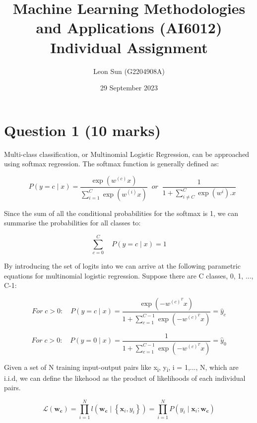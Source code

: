 \documentclass{article}
\title{ Machine Learning Methodologies and Applications (AI6012) Individual Assignment}
\author{Leon Sun (G2204908A)}
\date{29 September 2023}
\begin{document}
\maketitle
 

\section{Question 1 (10 marks)}

Multi-class classification, or Multinomial Logistic Regression, can be approached using softmax regression. The softmax function is generally defined as:

\begin{equation}
    \quad P(y=c \mid x)=\frac{\exp \left(w^{(c)} x\right)}{\sum_{i=1}^{C} \exp \left(w^{(i)} x\right)}\;\;or\;\;\frac{1}{1+\sum_{i\neq C}^{C} \exp \left(w^{i}\right).x}
\end{equation}
\linebreak

Since the sum of all the conditional probabilities for the softmax is 1, we can summarise the probabilities for all classes to:

\begin{equation}
    \sum_{c=0}^{C} \quad P(y=c \mid x)=1
\end{equation}

By introducing the set of logits into we can arrive at the following parametric equations for multinomial logistic regression. Suppose there are C classes, {0, 1, ..., C-1}:

\begin{equation}
    For\;c>0: \quad P(y=c \mid x)=\frac{\exp \left(-w^{(c)^T} x\right)}{1+\sum_{c=1}^{C-1} \exp \left(-w^{(c)^T} x\right)}=\hat{y}_c
\end{equation}

\begin{equation}
    For\;c>0: \quad P(y=0 \mid x)=\frac{1}{1+\sum_{c=1}^{C-1} \exp \left(-w^{(c)^T} x\right)}=\hat{y}_0
\end{equation}

Given a set of N training input-output pairs like {x\textsubscript{i}, y\textsubscript{i}}, i = 1,..., N, which are i.i.d, we can define the likehood as the product of likelihoods of each individual pairs.

\begin{equation}
    \mathcal{L}(\boldsymbol{w_c})=\prod_{i=1}^N l\left(\boldsymbol{w_c} \mid\left\{\boldsymbol{x}_i, y_i\right\}\right)=\prod_{i=1}^N P\left(y_i \mid \boldsymbol{x}_i ; \boldsymbol{w_c}\right)
    \end{equation}
\end{document}
